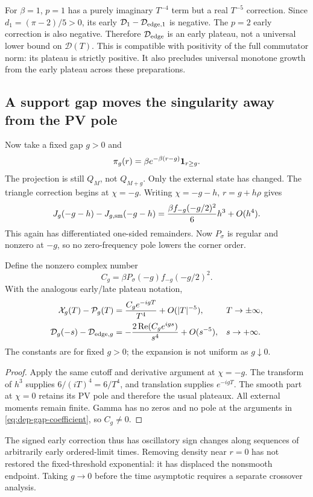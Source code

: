 For $\beta=1$, $p=1$ has a purely imaginary $T^{-4}$ term but a
real $T^{-5}$ correction. Since $d_1=(\pi-2)/5>0$, its early
$\mathcal D_1-\mathcal D_{{\rm edge},1}$ is negative. The $p=2$
early correction is also negative. Therefore
$\mathcal D_{\rm edge}$ is an early plateau, not a universal lower
bound on $\mathcal D(T)$. This is compatible with positivity of the
full commutator norm: its plateau is strictly positive. It also
precludes universal monotone growth from the early plateau across
these preparations.

\subsection{A support gap moves the singularity away from the PV pole}
Now take a fixed gap $g>0$ and
\begin{equation}
 \pi_g(r)=\beta e^{-\beta(r-g)}\mathbf 1_{r\ge g}.
 \label{eq:dep-gap-density}
\end{equation}
The projection is still $Q_M$, not $Q_{M+g}$. Only the external state
has changed. The triangle correction begins at $\chi=-g$. Writing
$\chi=-g-h$, $r=g+h\rho$ gives
\[
 J_g(-g-h)-J_{g,\rm sm}(-g-h)
 =\frac{\beta f_{-g}(-g/2)^2}{6}h^3+O(h^4).
\]
This again has differentiated one-sided remainders. Now $P_\sigma$
is regular and nonzero at $-g$, so no zero-frequency pole lowers
the corner order.
\begin{proposition}
Define the nonzero complex number
\begin{equation}
 C_g=\beta P_\sigma(-g)f_{-g}(-g/2)^2.
 \label{eq:dep-gap-coefficient}
\end{equation}
With the analogous early/late plateau notation,
\begin{align}
 \mathcal X_g(T)-\mathcal P_g(T)
   &=\frac{C_g e^{-igT}}{T^4}+O(|T|^{-5}),&&T\to\pm\infty,\notag\\
 \mathcal D_g(-s)-\mathcal D_{{\rm edge},g}
   &=-\frac{2\operatorname{Re}(C_g e^{igs})}{s^4}+O(s^{-5}),
      &&s\to+\infty.
 \label{eq:dep-gap-tail}
\end{align}
The constants are for fixed $g>0$; the expansion is not uniform as
$g\downarrow0$.
\label{prop:dep-gap}
\end{proposition}
\begin{proof}
Apply the same cutoff and derivative argument at $\chi=-g$.
The transform of $h^3$ supplies $6/(iT)^4=6/T^4$, and translation
supplies $e^{-igT}$. The smooth part at $\chi=0$ retains its PV pole
and therefore the usual plateaux. All external moments remain finite.
Gamma has no zeros and no pole at the arguments in
\eqref{eq:dep-gap-coefficient}, so $C_g\ne0$.
\end{proof}
The signed early correction thus has oscillatory sign changes along
sequences of arbitrarily early ordered-limit times. Removing density
near $r=0$ has not restored the fixed-threshold exponential: it has
displaced the nonsmooth endpoint. Taking $g\to0$ before the time
asymptotic requires a separate crossover analysis.

